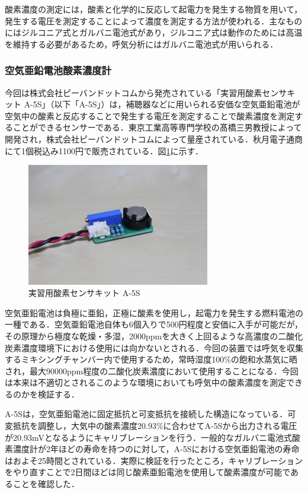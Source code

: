 酸素濃度の測定には，酸素と化学的に反応して起電力を発生する物質を用いて，発生する電圧を測定することによって濃度を測定する方法が使われる．主なものにはジルコニア式とガルバニ電池式があり，ジルコニア式は動作のためには高温を維持する必要があるため，呼気分析にはガルバニ電池式が用いられる．

\subsubsection{空気亜鉛電池酸素濃度計}

今回は株式会社ピーバンドットコムから発売されている「実習用酸素センサキット A-5S」（以下「A-5S」）は，補聴器などに用いられる安価な空気亜鉛電池が空気中の酸素と反応することで発生する電圧を測定することで酸素濃度を測定することができるセンサーである．東京工業高等専門学校の髙橋三男教授によって開発され，株式会社ピーバンドットコムによって量産されている．秋月電子通商にて1個税込み1100円で販売されている．図\ref{fig:a-5s}に示す．

\begin{figure}[H]
  \begin{center}
    \includegraphics[width=8cm]{fig/a-5s}
    \caption{実習用酸素センサキット A-5S}
    \label{fig:a-5s}
  \end{center}
\end{figure}

空気亜鉛電池は負極に亜鉛，正極に酸素を使用し，起電力を発生する燃料電池の一種である．空気亜鉛電池自体も6個入りで500円程度と安価に入手が可能だが，その原理から極度な乾燥・多湿，2000ppmを大きく上回るような高濃度の二酸化炭素濃度環境下における使用には向かないとされる．今回の装置では呼気を収集するミキシングチャンバー内で使用するため，常時湿度100\%の飽和水蒸気に晒され，最大90000ppm程度の二酸化炭素濃度において使用することになる．今回は本来は不適切とされるこのような環境においても呼気中の酸素濃度を測定できるのかを検証する．

A-5Sは，空気亜鉛電池に固定抵抗と可変抵抗を接続した構造になっている．可変抵抗を調整し，大気中の酸素濃度20.93\%に合わせてA-5Sから出力される電圧が20.93mVとなるようにキャリブレーションを行う．一般的なガルバニ電池式酸素濃度計が2年ほどの寿命を持つのに対して，A-5Sにおける空気亜鉛電池の寿命はおよそ25時間とされている．実際に検証を行ったところ，キャリブレーションをやり直すことで2日間ほどは同じ酸素亜鉛電池を使用して酸素濃度が可能であることを確認した．

